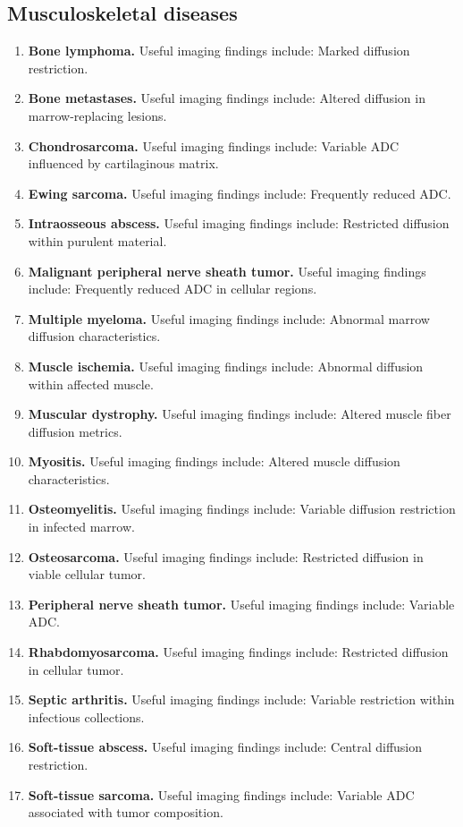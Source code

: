 \subsection{Musculoskeletal diseases}
\begin{enumerate}[leftmargin=*,itemsep=0.45em,topsep=0.4em]
\item \textbf{Bone lymphoma.} Useful imaging findings include: Marked diffusion restriction.
\item \textbf{Bone metastases.} Useful imaging findings include: Altered diffusion in marrow-replacing lesions.
\item \textbf{Chondrosarcoma.} Useful imaging findings include: Variable ADC influenced by cartilaginous matrix.
\item \textbf{Ewing sarcoma.} Useful imaging findings include: Frequently reduced ADC.
\item \textbf{Intraosseous abscess.} Useful imaging findings include: Restricted diffusion within purulent material.
\item \textbf{Malignant peripheral nerve sheath tumor.} Useful imaging findings include: Frequently reduced ADC in cellular regions.
\item \textbf{Multiple myeloma.} Useful imaging findings include: Abnormal marrow diffusion characteristics.
\item \textbf{Muscle ischemia.} Useful imaging findings include: Abnormal diffusion within affected muscle.
\item \textbf{Muscular dystrophy.} Useful imaging findings include: Altered muscle fiber diffusion metrics.
\item \textbf{Myositis.} Useful imaging findings include: Altered muscle diffusion characteristics.
\item \textbf{Osteomyelitis.} Useful imaging findings include: Variable diffusion restriction in infected marrow.
\item \textbf{Osteosarcoma.} Useful imaging findings include: Restricted diffusion in viable cellular tumor.
\item \textbf{Peripheral nerve sheath tumor.} Useful imaging findings include: Variable ADC.
\item \textbf{Rhabdomyosarcoma.} Useful imaging findings include: Restricted diffusion in cellular tumor.
\item \textbf{Septic arthritis.} Useful imaging findings include: Variable restriction within infectious collections.
\item \textbf{Soft-tissue abscess.} Useful imaging findings include: Central diffusion restriction.
\item \textbf{Soft-tissue sarcoma.} Useful imaging findings include: Variable ADC associated with tumor composition.
\end{enumerate}

